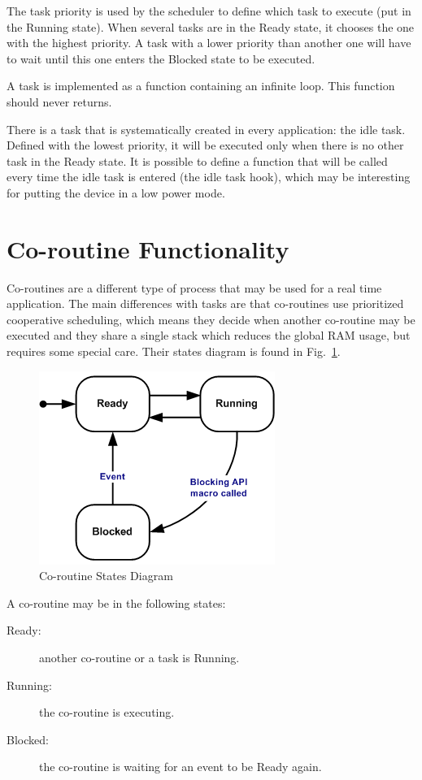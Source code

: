 \documentclass[11pt]{report}
\begin{document}
The task priority is used by the scheduler to define which task to execute (put in the Running state). When several tasks are in the Ready state, it chooses the one with the highest priority. A task with a lower priority than another one will have to wait until this one enters the Blocked state to be executed.

A task is implemented as a function containing an infinite loop. This function should never returns.

There is a task that is systematically created in every application: the idle task. Defined with the lowest priority, it will be executed only when there is no other task in the Ready state. It is possible to define a function that will be called every time the idle task is entered (the idle task hook), which may be interesting for putting the device in a low power mode.

\section{Co-routine Functionality}
Co-routines are a different type of process that may be used for a real time application. The main differences with tasks are that co-routines use prioritized cooperative scheduling, which means they decide when another co-routine may be executed and they share a single stack which reduces the global RAM usage, but requires some special care. Their states diagram is found in Fig.~\ref{cr_diagram}.

\begin{figure}
\begin{center}
\includegraphics[scale=0.5]{figures/crstate.png}
\end{center}
\caption{Co-routine States Diagram}
\label{cr_diagram}
\end{figure}

A co-routine may be in the following states:
\begin{description}
	\item[Ready:] another co-routine or a task is Running.
	\item[Running:] the co-routine is executing.
	\item[Blocked:] the co-routine is waiting for an event to be Ready again.
\end{description}
\end{document}
